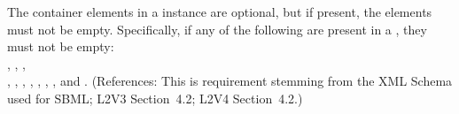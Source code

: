 The  container elements in a \Model instance are optional,
but if present, the elements must not be empty.  Specifically, if
any of the following are present in a \Model, they must not be empty:\\
,
,
,
\\ ,
, 
,
,
,
,
,
 and .  (References:
This is requirement stemming from the XML Schema used for SBML;
L2V3 Section~4.2; L2V4 Section~4.2.)
